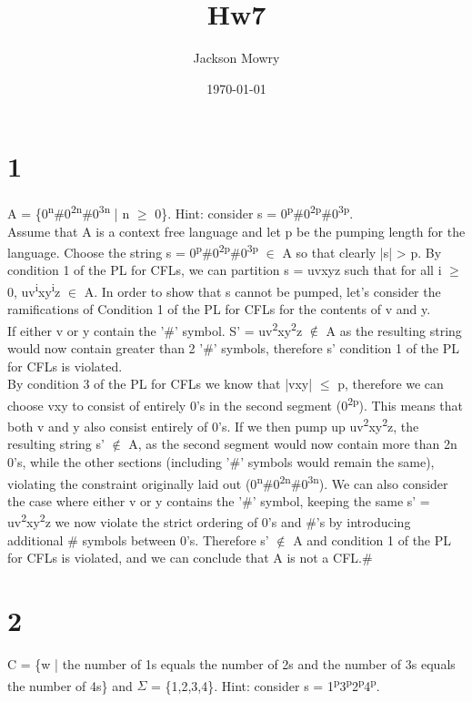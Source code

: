 \documentclass[11pt]{article}
\author{Jackson Mowry}
\date{\today}
\title{Hw7}
\begin{document}
\maketitle
\section{1}
\label{sec:org4a50f81}
A = \{0\textsuperscript{n}\#0\textsuperscript{2n}\#0\textsuperscript{3n} | n \(\ge\) 0\}. Hint: consider s = 0\textsuperscript{p}\#0\textsuperscript{2p}\#0\textsuperscript{3p}.\\

Assume that A is a context free language and let p be the pumping length for the language. Choose the string s = 0\textsuperscript{p}\#0\textsuperscript{2p}\#0\textsuperscript{3p} \(\in\) A so that clearly |s| > p. By condition 1 of the PL for CFLs, we can partition s = uvxyz such that for all i \(\ge\) 0, uv\textsuperscript{i}xy\textsuperscript{i}z \(\in\) A. In order to show that s cannot be pumped, let's consider the ramifications of Condition 1 of the PL for CFLs for the contents of v and y.\\

If either v or y contain the '\#' symbol. S' = uv\textsuperscript{2}xy\textsuperscript{2}z \(\notin\) A as the resulting string would now contain greater than 2 '\#' symbols, therefore s' condition 1 of the PL for CFLs is violated.\\

By condition 3 of the PL for CFLs we know that |vxy| \(\le\) p, therefore we can choose vxy to consist of entirely 0's in the second segment (0\textsuperscript{2p}). This means that both v and y also consist entirely of 0's. If we then pump up uv\textsuperscript{2}xy\textsuperscript{2}z, the resulting string s' \(\notin\) A, as the second segment would now contain more than 2n 0's, while the other sections (including '\#' symbols would remain the same), violating the constraint originally laid out (0\textsuperscript{n}\#0\textsuperscript{2n}\#0\textsuperscript{3n}). We can also consider the case where either v or y contains the '\#' symbol, keeping the same s' = uv\textsuperscript{2}xy\textsuperscript{2}z we now violate the strict ordering of 0's and \#'s by introducing additional \# symbols between 0's. Therefore s' \(\notin\) A and condition 1 of the PL for CFLs is violated, and we can conclude that A is not a CFL.\#\\
\section{2}
\label{sec:orgb895d5e}
C = \{w | the number of 1s equals the number of 2s and the number of 3s equals the number of 4s\} and \(\Sigma\) = \{1,2,3,4\}. Hint: consider s = 1\textsuperscript{p}3\textsuperscript{p}2\textsuperscript{p}4\textsuperscript{p}.\\
\end{document}
